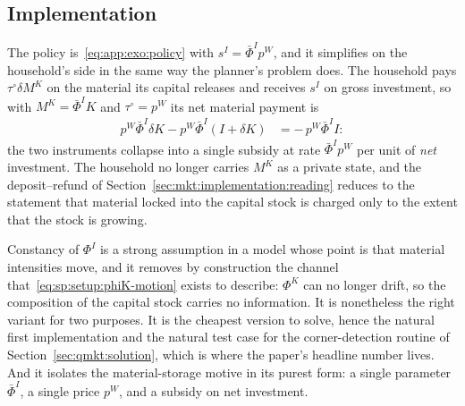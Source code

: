 \subsection{Implementation}\label{sec:app:const:market}

The policy is~\eqref{eq:app:exo:policy} with $s^I=\bar\Phi^Ip^W$, and it simplifies on the household's
side in the same way the planner's problem does. The household pays $\tau^{\circ}\delta M^K$ on the
material its capital releases and receives $s^I$ on gross investment, so with
$M^K=\bar\Phi^IK$ and $\tau^{\circ}=p^W$ its net material payment is
\begin{align}
p^W\bar\Phi^I\delta K-p^W\bar\Phi^I\left(I+\delta K\right) &= -\,p^W\bar\Phi^II :
\label{eq:app:const:hh}
\end{align}
the two instruments collapse into a single subsidy at rate $\bar\Phi^Ip^W$ per unit of \emph{net}
investment. The household no longer carries $M^K$ as a private state, and the deposit--refund of
Section~\ref{sec:mkt:implementation:reading} reduces to the statement that material locked into the
capital stock is charged only to the extent that the stock is growing.

\begin{remark}\label{rem:app:const:legit}
Constancy of $\Phi^I$ is a strong assumption in a model whose point is that material intensities move,
and it removes by construction the channel that~\eqref{eq:sp:setup:phiK-motion} exists to describe:
$\Phi^K$ can no longer drift, so the composition of the capital stock carries no information. It is
nonetheless the right variant for two purposes. It is the cheapest version to solve, hence the natural
first implementation and the natural test case for the corner-detection routine of
Section~\ref{sec:qmkt:solution}, which is where the paper's headline number lives. And it isolates the
material-storage motive in its purest form: a single parameter $\bar\Phi^I$, a single price $p^W$, and
a subsidy on net investment.
\end{remark}
